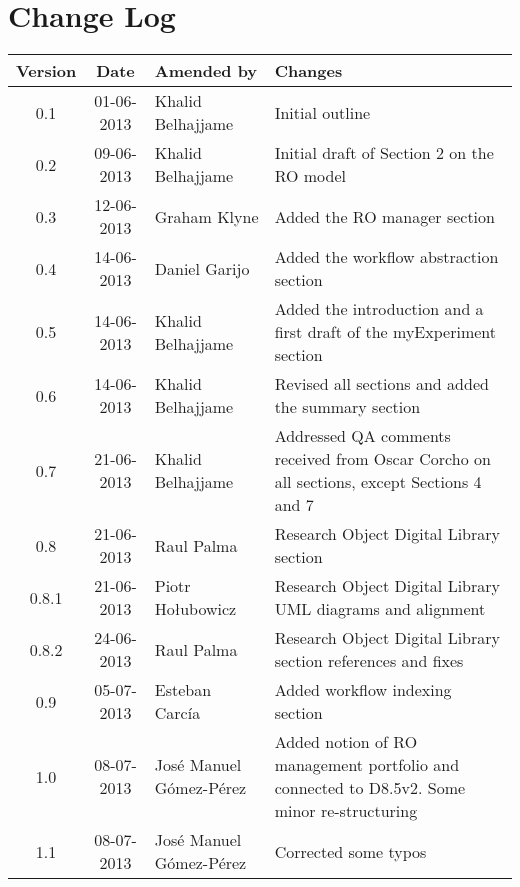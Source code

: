 \documentclass[a4paper, twoside, 11pt]{article}
\begin{document}
\section*{Change Log}
\begin{centering}

\begin{tabular}{|c|c|p{4.92cm}|p{6.5cm}|}

\hline \textbf{Version} & \textbf{Date} & \textbf{Amended by} & \textbf{Changes} \\ \hline
0.1 & 01-06-2013 & Khalid Belhajjame & Initial outline \\ \hline
0.2 & 09-06-2013 & Khalid Belhajjame & Initial draft of Section 2 on the RO model \\ \hline
0.3 & 12-06-2013 & Graham Klyne & Added the RO manager section \\ \hline
0.4 & 14-06-2013 & Daniel Garijo & Added the workflow abstraction section \\ \hline
0.5 & 14-06-2013 & Khalid Belhajjame & Added the introduction and a first draft of the myExperiment section \\ \hline
0.6 & 14-06-2013 & Khalid Belhajjame & Revised all sections and added the summary section \\ \hline
0.7 & 21-06-2013 & Khalid Belhajjame & Addressed QA comments received from Oscar Corcho on all sections, except Sections 4 and 7 \\ \hline
0.8 & 21-06-2013 & Raul Palma & Research Object Digital Library section \\ \hline
0.8.1 & 21-06-2013 & Piotr Ho\l{}ubowicz & Research Object Digital Library UML diagrams and alignment\\ \hline
0.8.2 & 24-06-2013 & Raul Palma & Research Object Digital Library section references and fixes\\ \hline
0.9 & 05-07-2013 & Esteban Carc\'{i}a & Added workflow indexing section\\ \hline
1.0 & 08-07-2013 & Jos\'{e} Manuel G\'{o}mez-P\'{e}rez & Added notion of RO management portfolio and connected to D8.5v2. Some minor re-structuring\\ \hline
1.1 & 08-07-2013 & Jos\'{e} Manuel G\'{o}mez-P\'{e}rez & Corrected some typos\\ \hline



\end{tabular}

\end{centering}
\clearpage
\end{document}
